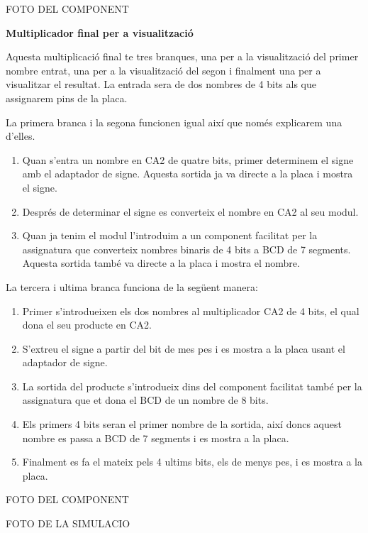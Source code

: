\documentclass[12pt, a4papre]{article}
\begin{document}
	\begin{center}
	FOTO DEL COMPONENT
	\end{center}
	
	\textbf{\large{Multiplicador final per a visualització}}
	
	Aquesta multiplicació final te tres branques, una per a la visualització del primer nombre entrat, una per a la visualització del segon i finalment una per a visualitzar el resultat. La entrada sera de dos nombres de 4 bits als que assignarem pins de la placa. 
	
	La primera branca i la segona funcionen igual així que només explicarem una d'elles. 
	\begin{enumerate}
	\item Quan s'entra un nombre en CA2 de quatre bits, primer determinem el signe amb el adaptador de signe. Aquesta sortida ja va directe a la placa i mostra el signe.
	\item Després de determinar el signe es converteix el nombre en CA2 al seu modul.
	\item Quan ja tenim el modul l'introduim a un component facilitat per la assignatura que converteix nombres binaris de 4 bits a BCD de 7 segments. Aquesta sortida també va directe a la placa i mostra el nombre.
	\end{enumerate}
	
	La tercera i ultima branca funciona de la següent manera:
	\begin{enumerate}
	\item Primer s'introdueixen els dos nombres al multiplicador CA2 de 4 bits, el qual dona el seu producte en CA2.
	\item S'extreu el signe a partir del bit de mes pes i es mostra a la placa usant el adaptador de signe.
	\item La sortida del producte s'introdueix dins del component facilitat també per la assignatura que et dona el BCD de un nombre de 8 bits.
	\item Els primers 4 bits seran el primer nombre de la sortida, així doncs aquest nombre es passa a BCD de 7 segments i es mostra a la placa.
	\item Finalment es fa el mateix pels 4 ultims bits, els de menys pes, i es mostra a la placa.
	\end{enumerate}
	
	\begin{center}
	FOTO DEL COMPONENT
	
	FOTO DE LA SIMULACIO
	\end{center}
	
\end{document}
